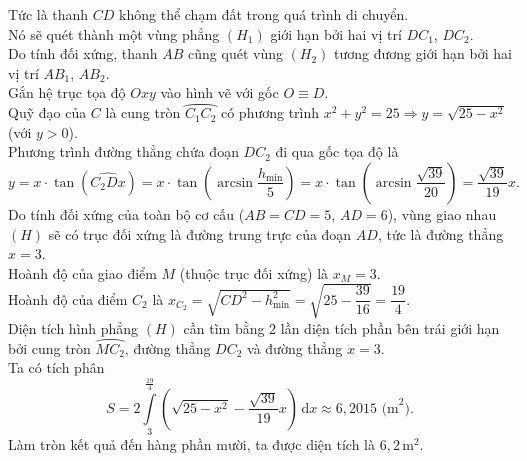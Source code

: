 \begin{ex}
\begin{chc}
{			Tức là thanh $CD$ không thể chạm đất trong quá trình di chuyển.\\ Nó sẽ quét thành một vùng phẳng $(H_1)$ giới hạn bởi hai vị trí $DC_1$, $DC_2$.\\ Do tính đối xứng, thanh $AB$ cũng quét vùng $(H_2)$ tương đương giới hạn bởi hai vị trí $AB_1$, $AB_2$.\\
			Gắn hệ trục tọa độ $Oxy$ vào hình vẽ với gốc $O \equiv D$.\\ Quỹ đạo của $C$ là cung tròn $\wideparen{C_1C_2}$ có phương trình $x^2 + y^2 = 25 \Rightarrow y = \sqrt{25 - x^2}$ (với $y>0$).\\
			Phương trình đường thẳng chứa đoạn $DC_2$ đi qua gốc tọa độ là
			\[ y = x\cdot \tan\left(\widehat{C_2Dx}\right) = x\cdot \tan\left(\arcsin\dfrac{h_{\min}}{5}\right) = x\cdot \tan\left(\arcsin\dfrac{\sqrt{39}}{20}\right) = \dfrac{\sqrt{39}}{19}x. \]
			Do tính đối xứng của toàn bộ cơ cấu ($AB=CD=5$, $AD=6$), vùng giao nhau $(H)$ sẽ có trục đối xứng là đường trung trực của đoạn $AD$, tức là đường thẳng $x = 3$. \\
			Hoành độ của giao điểm $M$ (thuộc trục đối xứng) là $x_M = 3$.\\ Hoành độ của điểm $C_2$ là $x_{C_2} = \sqrt{CD^2 - h_{\min}^2} = \sqrt{25 - \dfrac{39}{16}} = \dfrac{19}{4}$.\\
			Diện tích hình phẳng $(H)$ cần tìm bằng $2$ lần diện tích phần bên trái giới hạn bởi cung tròn $\wideparen{MC_2}$, đường thẳng $DC_2$ và đường thẳng $x=3$.\\ Ta có tích phân
			\[ S = 2\displaystyle\int\limits_{3}^{\tfrac{19}{4}} \left( \sqrt{25 - x^2} - \dfrac{\sqrt{39}}{19}x \right) \mathrm{\,d}x \approx 6{,}2015 \text{ (m}^2\text{)}. \]
			Làm tròn kết quả đến hàng phần mười, ta được diện tích là $6{,}2$\,m$^2$.
		}
	\end{chc}
\end{ex}

